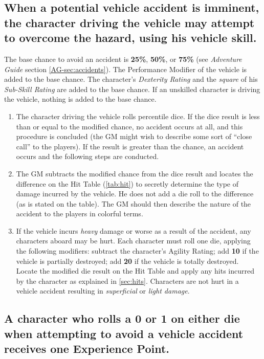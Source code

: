 \subsection[Vehicle Accidents]{When a potential vehicle accident is
  imminent, the character driving the vehicle may attempt to overcome
  the hazard, using his vehicle skill.}
\label{sec:vehaccidents}

The base chance to avoid an accident is \textbf{25\%}, \textbf{50\%},
or \textbf{75\%} (see \emph{Adventure Guide} section
\ref{AG-sec:accidents}).  The Performance Modifier of the vehicle is
added to the base chance.  The character's \emph{Dexterity Rating} and
the \emph{square} of his \emph{Sub-Skill Rating} are added to the base
chance.  If an unskilled character is driving the vehicle, nothing is
added to the base chance.

\begin{enumerate}
\item The character driving the vehicle rolls percentile dice.  If the
  dice result is less than or equal to the modified chance, no
  accident occurs at all, and this procedure is concluded (the GM
  might wish to describe some sort of ``close call'' to the players).
  If the result is greater than the chance, an accident occurs and the
  following steps are conducted.
\item The GM subtracts the modified chance from the dice result and
  locates the difference on the Hit Table (\ref{tab:hit}) to secretly
  determine the type of damage incurred by the vehicle.  He does not
  add a die roll to the difference (as is stated on the table).  The
  GM should then describe the nature of the accident to the players in
  colorful terms.
\item If the vehicle incurs \emph{heavy} damage or worse as a result
  of the accident, any characters aboard may be hurt.  Each character
  must roll one die, applying the following modifiers: subtract the
  character's Agility Rating; add \textbf{10} if the vehicle is
  partially destroyed; add \textbf{20} if the vehicle is totally
  destroyed.  Locate the modified die result on the Hit Table and
  apply any hits incurred by the character as explained in
  \ref{sec:hits}.  Characters are not hurt in a vehicle accident
  resulting in \emph{superficial} or \emph{light damage}.
\end{enumerate}

\subsection[Vehicle Experience Points]{A character who rolls a
  \textbf{0} or \textbf{1} on either die when attempting to avoid a
  vehicle accident receives one Experience Point.}
\label{sec:vehicleeps}

